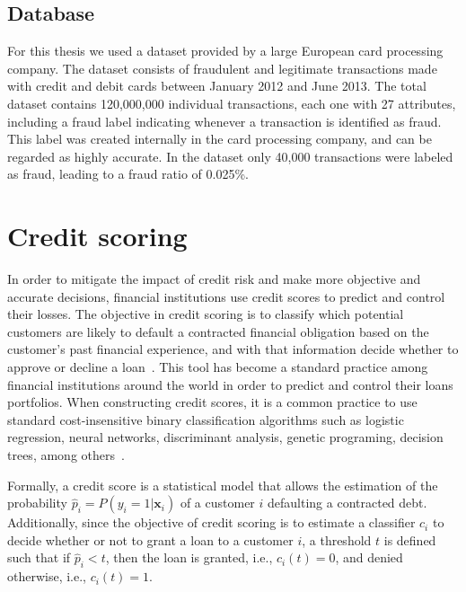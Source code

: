 	\subsection{Database}

 	For this thesis we used a dataset provided by a large European card processing company. The 
	dataset consists of fraudulent and legitimate transactions made with credit and debit cards 
	between January 2012 and June 2013. The total dataset contains 120,000,000 individual 
	transactions, each one with 27 attributes, including a fraud label indicating whenever a 
	transaction is identified as fraud. This label was created internally in the card processing 
	company, and can be regarded as highly accurate. In the dataset only 40,000 transactions were 
	labeled as fraud, leading to a fraud ratio of 0.025\%. 

	
\section{Credit scoring}
\label{sec:4:creditscoring}

  In order to mitigate the impact of credit risk and make more objective and accurate decisions, 
  financial institutions use credit scores to predict and control their losses.
  The objective in credit scoring is to classify which potential customers are likely to default a 
  contracted financial obligation based on the customer's past financial experience, and with that 
  information decide whether to approve or decline a loan~\citep{Anderson2007}. This tool has 
  become a standard practice among financial institutions around the world in order to predict 
  and control their loans portfolios. When constructing credit scores, it is a common practice to 
  use standard cost-insensitive binary classification algorithms such as logistic regression, 
  neural networks, discriminant analysis, genetic programing, decision trees, among 
  others~\citep{Hand1997,Bahnsen2011}. 
  
  Formally, a credit score is a statistical model that allows the estimation of the probability 
  $\hat p_i=P(y_i=1|\mathbf{x}_i)$ of a customer $i$ defaulting a contracted debt. Additionally, 
since the 
  objective of credit scoring is to estimate a classifier $c_i$ to decide whether or not to grant a 
  loan to a customer $i$, a threshold $t$ is defined such that if $\hat p_i <t$, then the loan is 
  granted, i.e., $c_i(t)=0$, and denied otherwise, i.e., $c_i(t)=1$.
  
